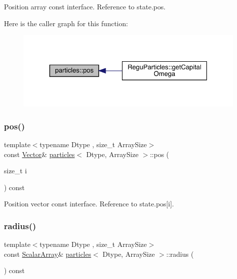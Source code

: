 Position array const interface. Reference to state.\+pos. 

Here is the caller graph for this function\+:
\nopagebreak
\begin{figure}[H]
\begin{center}
\leavevmode
\includegraphics[width=320pt]{classparticles_a746aa73a995101af269d0a64c76319a2_icgraph}
\end{center}
\end{figure}
\mbox{\label{classparticles_a5a92ff9c5826ad7e4622f36665bc48a6}} 
\subsubsection{\texorpdfstring{pos()}{pos()}\hspace{0.1cm}{\footnotesize\ttfamily [2/2]}}
{\footnotesize\ttfamily template$<$typename Dtype , size\+\_\+t Array\+Size$>$ \\
const \mbox{\hyperlink{classparticles_a1ef27d2f046db6514d79c8d7ee5c97d5}{Vector}}\& \mbox{\hyperlink{classparticles}{particles}}$<$ Dtype, Array\+Size $>$\+::pos (\begin{DoxyParamCaption}\item[{size\+\_\+t}]{i }\end{DoxyParamCaption}) const\hspace{0.3cm}{\ttfamily [inline]}}



Position vector const interface. Reference to state.\+pos\mbox{[}i\mbox{]}. 

\mbox{\label{classparticles_a2f307a8b96534016614d4665ddfbe547}} 
\subsubsection{\texorpdfstring{radius()}{radius()}\hspace{0.1cm}{\footnotesize\ttfamily [1/2]}}
{\footnotesize\ttfamily template$<$typename Dtype , size\+\_\+t Array\+Size$>$ \\
const \mbox{\hyperlink{classparticles_ac88daa0d493d17c5ca2fe3a1d3fe4779}{Scalar\+Array}}\& \mbox{\hyperlink{classparticles}{particles}}$<$ Dtype, Array\+Size $>$\+::radius (\begin{DoxyParamCaption}{ }\end{DoxyParamCaption}) const\hspace{0.3cm}{\ttfamily [inline]}}



